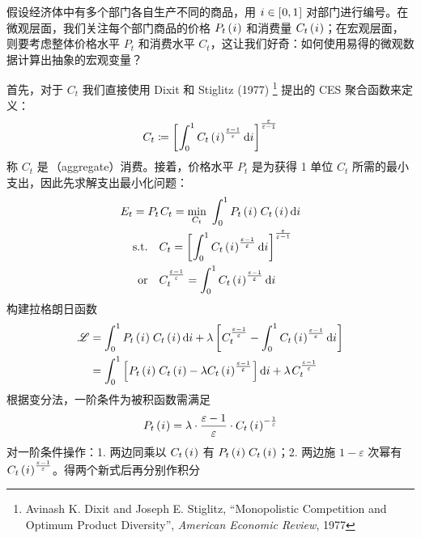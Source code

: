 假设经济体中有多个部门各自生产不同的商品，用 \(i\in\left[\mspace{1mu}0,1\mspace{1mu}\right]\) 对部门进行编号。在微观层面，我们关注每个部门商品的价格 \(P_t\left(\mspace{1mu} i\mspace{1mu}\right)\) 和消费量 \(C_t\left(\mspace{1mu} i\mspace{1mu}\right)\)；在宏观层面，则要考虑整体价格水平 \(P_t\) 和消费水平 \(C_t\)，这让我们好奇：如何使用易得的微观数据计算出抽象的宏观变量？

首先，对于 \(C_t\) 我们直接使用 Dixit 和 Stiglitz (1977) \footnote{Avinash K. Dixit and Joseph E. Stiglitz, ``Monopolistic Competition and Optimum Product Diversity'', \emph{American Economic Review}, 1977} 提出的 CES 聚合函数来定义：
\begin{equation*}
    C_t\coloneq\left[\mspace{1mu}\int^1_0 C_t\left(\mspace{1mu} i\mspace{1mu}\right)^{\frac{\varepsilon-1}\varepsilon}\mathrm{d}i\mspace{1mu}\right]^{\frac\varepsilon{\varepsilon-1}}
\end{equation*}
称 \(C_t\) 是\,（aggregate）消费。接着，价格水平 \(P_t\) 是为获得 1 单位 \(C_t\) 所需的最小支出，因此先求解支出最小化问题：
\begin{align*}
    E_t =\;&P_t\,C_t= \min_{C_t} \ \int^1_0 P_t\bki \, C_t\bki \mathrm{d}i \\
    \text{s.t.} &\quad C_t=\bks{\int^1_0 C_t\bki^{\frac{\varepsilon-1}\varepsilon}\mathrm{d}i}^{\frac\varepsilon{\varepsilon-1}} \\
    \text{or} & \quad C_t^{\frac{\varepsilon-1}{\varepsilon}}=\int^1_0 C_t\bki^{\frac{\varepsilon-1}\varepsilon}\mathrm{d}i
\end{align*}
构建拉格朗日函数
\begin{align*}
    \scr L &=\int^1_0 P_t\bki \, C_t\bki\mathrm di+\lambda\bks{C_t^{\frac{\varepsilon-1}\varepsilon}-\int^1_0C_t\bki ^{\frac{\varepsilon-1}\varepsilon}\mathrm di}\\
    &= \int^1_0 \bks{P_t\bki \, C_t\bki-\lambda C_t\bki ^{\frac{\varepsilon-1}\varepsilon}}\mathrm di+\lambda\,C_t^{\frac{\varepsilon-1}\varepsilon}
\end{align*}
根据变分法，一阶条件为被积函数需满足
\begin{align*}
    P_t\left(\mspace{1mu} i\mspace{1mu}\right)=\lambda\cdot\dfrac{\varepsilon-1}\varepsilon\cdot C_t\left(\mspace{1mu} i\mspace{1mu}\right) ^{-\frac1\varepsilon}
\end{align*}
对一阶条件操作：1. 两边同乘以 \(C_t\left(\mspace{1mu} i\mspace{1mu}\right)\) 有 \(P_t\bki \, C_t\bki\)；2. 两边施 \(1-\varepsilon\) 次幂有 \(C_t\left(\mspace{1mu} i\mspace{1mu}\right)^{\frac{\varepsilon-1}\varepsilon}\)。得两个新式后再分别作积分
